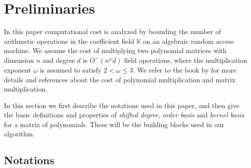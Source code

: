 
\section{Preliminaries}

In this paper computational cost is analyzed by bounding the number
of arithmetic operations in the coefficient field $\mathbb{K}$ on
an algebraic random access machine. We assume the cost of multiplying
two polynomial matrices with dimension $n$ and degree $d$ is $O^{\sim}(n^{\omega}d)$
field operations, where the multiplication exponent $\omega$ is assumed
to satisfy $2<\omega\le3$. We refer to the book by \cite{vonzurgathen}
for more details and references about the cost of polynomial multiplication
and matrix multiplication.

In this section we first describe the notations used in this paper,
and then give the basic definitions and properties of {\em shifted
degree}, {\em order basis} and {\em kernel basis} for a matrix
of polynomials. These will be the building blocks used in our algorithm.


\subsection{Notations}

